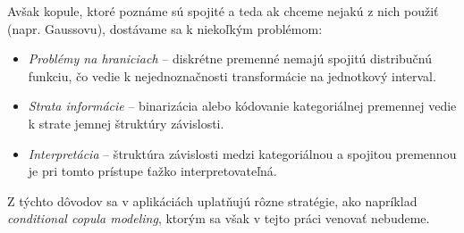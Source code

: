 Avšak kopule, ktoré poznáme sú spojité a teda ak chceme nejakú z nich použiť (napr. Gaussovu), dostávame sa k niekoľkým problémom:

\begin{itemize}
  \item \textit{Problémy na hraniciach} – diskrétne premenné nemajú spojitú distribučnú funkciu, čo vedie k nejednoznačnosti transformácie na jednotkový interval.
  \item \textit{Strata informácie} – binarizácia alebo kódovanie kategoriálnej premennej vedie k strate jemnej štruktúry závislosti.
  \item \textit{Interpretácia} – štruktúra závislosti medzi kategoriálnou a spojitou premennou je pri tomto prístupe ťažko interpretovateľná.
\end{itemize}

Z týchto dôvodov sa v aplikáciách uplatňujú rôzne stratégie, ako napríklad \textit{conditional copula modeling}, ktorým sa však v tejto práci venovať nebudeme.

